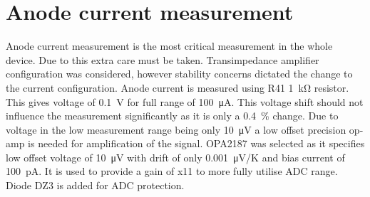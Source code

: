 \documentclass{article}
\begin{document}


\section{Anode current measurement}
Anode current measurement is the most critical measurement in the whole device. Due to this extra care must be taken. Transimpedance amplifier configuration was considered, however stability concerns dictated the change to the current configuration.
Anode current is measured using R41 \SI{1}{\kilo\ohm} resistor. This gives voltage of \SI{0.1}{\volt} for full range of \SI{100}{\micro\ampere}. This voltage shift should not influence the measurement significantly as it is only a \SI{0.4}{\%} change.
Due to voltage in the low measurement range being only \SI{10}{\micro\volt} a low offset precision op-amp is needed for amplification of the signal.
OPA2187 was selected as it specifies low offset voltage of \SI{10}{\micro\volt} with drift of only \SI{0.001}{\micro\volt/\kelvin} and bias current of \SI{100}{\pico\ampere}.
It is used to provide a gain of x11 to more fully utilise ADC range. Diode DZ3 is added for ADC protection.

\end{document}
